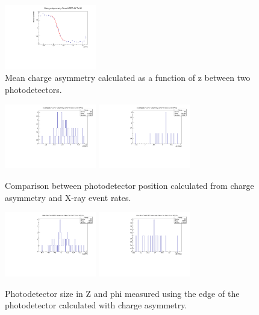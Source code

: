 \begin{figure}
\centering
\includegraphics[width=4cm]{graphics/asym6465.pdf}
\caption{Mean charge asymmetry calculated as a function of z between 
two photodetectors.}
\label{fig:asymplot} 
\end{figure}

\begin{figure}
\centering
\includegraphics[width=4cm]{plots/2018/dz_asymm_fit.pdf}
\includegraphics[width=4cm]{plots/2018/dphi_asymm_fit.pdf}
\caption{Comparison between photodetector position calculated from
charge asymmetry and X-ray event rates.}
\label{fig:asymvsfit} 
\end{figure}



\begin{figure}
\centering
\includegraphics[width=4cm]{plots/2018/mppcsize_z.pdf}
\includegraphics[width=4cm]{plots/2018/mppcsize_phi.pdf}
\caption{Photodetector size in Z and phi measured using the edge of the
photodetector calculated with charge asymmetry.}
\label{fig:mppcsize} 
\end{figure}



